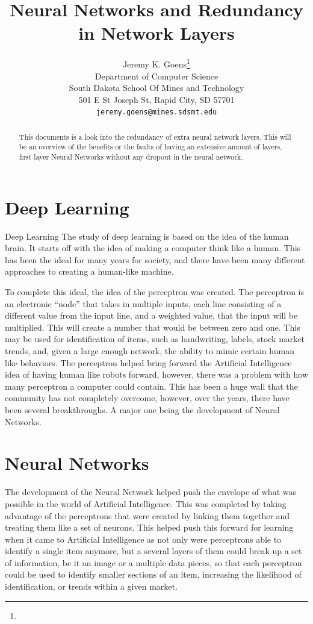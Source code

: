 \documentclass{article}
\title{Neural Networks and Redundancy in Network Layers}
\author{
  Jeremy K. Goens\thanks{ } \\
  Department of Computer Science\\
  South Dakota School Of Mines and Technology\\
  501 E St Joseph St, Rapid City, SD 57701\\
  \texttt{jeremy.goens@mines.sdsmt.edu} \\
}
\begin{document}

\maketitle

\begin{abstract}
  This documents is a look into the redundancy of extra neural network layers. This will 
  be an overview of the benefits or the faults of having an extensive amount of layers, first 
  layer Neural Networks without any dropout in the neural network.
\end{abstract}

\section{Deep Learning}

Deep Learning
The study of deep learning is based on the idea of the human brain. It starts off with the idea of making a computer think like a human. This has been the ideal for many years for society, and there have been many different approaches to creating a human-like machine.

To complete this ideal, the idea of the perceptron was created.  The perceptron is an electronic “node” that takes in multiple inputs, each line consisting of a different value from the input line, and a weighted value, that the input will be multiplied. This will create a number that would be between zero and one. This may be used for identification of items, such as handwriting, labels, stock market trends, and, given a large enough network, the ability to mimic certain human like behaviors.
The perceptron helped bring forward the Artificial Intelligence idea of having human like robots forward, however, there was a problem with how many perceptron a computer could contain. This has been a huge wall that the community has not completely overcome, however, over the years, there have been several breakthroughs. A major one being the development of Neural Networks.

\section{Neural Networks}
The development of the Neural Network helped push the envelope of what was possible in the world of Artificial Intelligence. This was completed by taking advantage of the perceptrons that were created by linking them together and treating them like a set of neurons. This helped push this forward for learning when it came to Artificial Intelligence as not only were perceptrons able to identify a single item anymore, but a several layers of them could break up a set of information, be it an image or a multiple data pieces, so that each perceptron could be used to identify smaller sections of an item, increasing the likelihood of identification, or trends within a given market.
\end{document}
